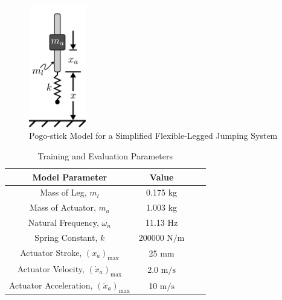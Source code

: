 \documentclass{ifacconf}
\begin{document}
   \begin{figure}[tb]
         \begin{center}
            \includegraphics[width=2.5cm]{figures/pogo_system.pdf}    %
            \caption{Pogo-stick Model for a Simplified Flexible-Legged Jumping System} 
            \label{fig:JumpingModel}
         \end{center}
         \vspace{0.25cm}
      \end{figure}
      
      \begin{table}[tb]
         \begin{center}
         \caption{Training and Evaluation Parameters}\label{tab:JumpingModelParameters}
            \begin{tabular}{cccc}
               \hline
               \hline 
               Model Parameter & Value \\ 
               \hline 
               Mass of Leg, $m_l$ & 0.175 kg \\ 
               Mass of Actuator, $m_a$ & 1.003 kg \\ 
               Natural Frequency, $\omega_n$ & 11.13 Hz \\ 
               Spring Constant, $k$ & 200000 $\mbox{N/m}$ \\ 
               \hline
               Actuator Stroke, $(x_a)_{\mbox{max}}$ & 25 mm \\
               Actuator Velocity, $(\dot{x}_a)_{\mbox{max}}$ & 2.0 $\mbox{m/s}$ \\
               Actuator Acceleration, $(\ddot{x}_a)_{\mbox{max}}$ & 10 $\mbox{m/s}$ \\ \hline \hline
            \end{tabular}
         \end{center}
         \vspace{4mm}
      \end{table}
\end{document}
